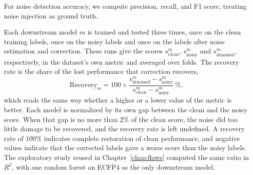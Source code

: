 For noise detection accuracy, we compute precision, recall, and F1 score, treating noise injection as ground truth.

Each downstream model $m$ is trained and tested three times, once on the clean training labels, once on the noisy labels and once on the labels after noise estimation and correction. These runs give the scores $s^{m}_{\text{clean}}$, $s^{m}_{\text{noisy}}$ and $s^{m}_{\text{denoised}}$, respectively, in the dataset's own metric and averaged over folds. The recovery rate is the share of the lost performance that correction recovers,
\begin{equation}
\mathrm{Recovery}_m = 100 \times \frac{s^{m}_{\text{denoised}} - s^{m}_{\text{noisy}}}{s^{m}_{\text{clean}} - s^{m}_{\text{noisy}}}\ \%,
\label{eq:recovery}
\end{equation}
which reads the same way whether a higher or a lower value of the metric is better. Each model is normalized by its own gap between the clean and the noisy score. When that gap is no more than $2\%$ of the clean score, the noise did too little damage to be recovered, and the recovery rate is left undefined. A recovery rate of $100\%$ indicates complete restoration of clean performance, and negative values indicate that the corrected labels gave a worse score than the noisy labels. The exploratory study reused in Chapter~\ref{chap:flaws} computed the same ratio in $R^2$, with one random forest on ECFP4 as the only downstream model.
% 
% 


